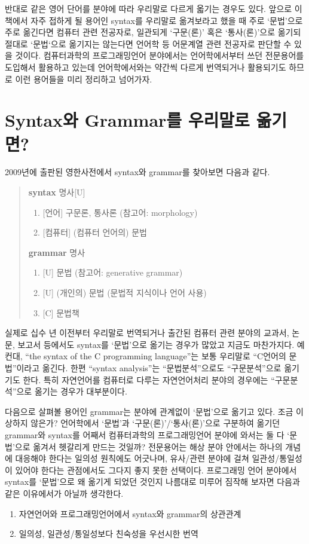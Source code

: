 \documentclass[b5paper,chapter,figtabcapt]{oblivoir}
\providecommand{\tightlist}{%
      \setlength{\itemsep}{0pt}\setlength{\parskip}{0pt}}
\begin{document}
반대로 같은 영어 단어를 분야에 따라 우리말로 다르게 옯기는 경우도 있다.
앞으로 이 책에서 자주 접하게 될 용어인 syntax를 우리말로 옮겨보라고
했을 때 주로 `문법'으로 주로 옮긴다면 컴퓨터 관련 전공자로,
일관되게 `구문(론)' 혹은 `통사(론)'으로 옮기되 절대로 `문법`으로
옮기지는 않는다면 언어학 등 어문계열 관련 전공자로 판단할 수 있을 것이다.
컴퓨터과학의 프로그래밍언어 분야에서는 언어학에서부터 쓰던 전문용어를
도입해서 활용하고 있는데 언어학에서와는 약간씩 다르게 번역되거나
활용되기도 하므로 이런 용어들을 미리 정리하고 넘어가자.


\section{Syntax와 Grammar를 우리말로 옮기면?}

2009년에 출판된 영한사전\cite{OxEKdict}에서 syntax와 grammar를 찾아보면 다음과 같다.
\begin{quote}
    \textbf{syntax} 명사[U] \vspace{-1ex}
    \begin{enumerate}\tightlist
    \item{} [언어] 구문론, 통사론 (참고어: morphology)
    \item{} [컴퓨터] (컴퓨터 언어의) 문법
    \end{enumerate}
    \textbf{grammar} 명사 \vspace{-1ex}
    \begin{enumerate}\tightlist
    \item{} [U] 문법 (참고어: generative grammar)
    \item{} [U] (개인의) 문법 (문법적 지식이나 언어 사용)
    \item{} [C] 문법책
    \end{enumerate}
\end{quote}

실제로 십수 년 이전부터 우리말로 번역되거나 출간된 컴퓨터 관련 분야의
교과서, 논문, 보고서 등에서도 syntax를 `문법'으로 옮기는 경우가 많았고
지금도 마찬가지다. 예컨대, ``the syntax of the C programming language''는
보통 우리말로 ``C언어의 문법''이라고 옮긴다. 한편 ``syntax analysis''는
``문법분석''으로도 ``구문분석''으로 옮기기도 한다. 특히 자연언어를 컴퓨터로
다루는 자연언어처리 분야의 경우에는 ``구문분석''으로 옮기는 경우가 대부분이다.

다음으로 살펴볼 용어인 grammar는 분야에 관계없이 `문법'으로 옮기고 있다.
조금 이상하지 않은가? 언어학에서 `문법'과 `구문(론)'/`통사(론)'으로 구분하여
옮기던 grammar와 syntax를 어째서 컴퓨터과학의 프로그래밍언어 분야에 와서는
둘 다 `문법'으로 옮겨서 헷갈리게 만드는 것일까? 전문용어는 해상 분야 안에서는
하나의 개념에 대응해야 한다는 일의성 원칙에도 어긋나며, 유사/관련 분야에 걸쳐
일관성/통일성이 있어야 한다는 관점에서도 그다지 좋지 못한 선택이다.
프로그래밍 언어 분야에서 syntax를 `문법'으로 왜 옮기게 되었던 것인지
나름대로 미루어 짐작해 보자면 다음과 같은 이유에서가 아닐까 생각한다.
\begin{enumerate}\tightlist
    \item 자연언어와 프로그래밍언어에서 syntax와 grammar의 상관관계
    \item 일의성, 일관성/통일성보다 친숙성을 우선시한 번역
\end{enumerate}
\end{document}
